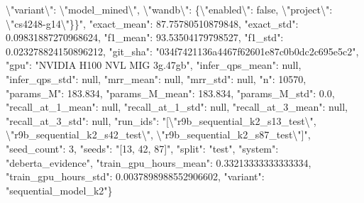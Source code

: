 \textbackslash{}"variant\textbackslash{}": \textbackslash{}"model\_mined\textbackslash{}", \textbackslash{}"wandb\textbackslash{}": \{\textbackslash{}"enabled\textbackslash{}": false, \textbackslash{}"project\textbackslash{}": \textbackslash{}"cs4248-g14\textbackslash{}"\}\}", "exact\_mean": 87.75780510879848, "exact\_std": 0.09831887270968624, "f1\_mean": 93.53504179798527, "f1\_std": 0.023278824150896212, "git\_sha": "034f7421136a4467f62601e87c0b0dc2c695e5c2", "gpu": "NVIDIA H100 NVL MIG 3g.47gb", "infer\_qps\_mean": null, "infer\_qps\_std": null, "mrr\_mean": null, "mrr\_std": null, "n": 10570, "params\_M": 183.834, "params\_M\_mean": 183.834, "params\_M\_std": 0.0, "recall\_at\_1\_mean": null, "recall\_at\_1\_std": null, "recall\_at\_3\_mean": null, "recall\_at\_3\_std": null, "run\_ids": "[\textbackslash{}"r9b\_sequential\_k2\_s13\_test\textbackslash{}", \textbackslash{}"r9b\_sequential\_k2\_s42\_test\textbackslash{}", \textbackslash{}"r9b\_sequential\_k2\_s87\_test\textbackslash{}"]", "seed\_count": 3, "seeds": "[13, 42, 87]", "split": "test", "system": "deberta\_evidence", "train\_gpu\_hours\_mean": 0.33213333333333334, "train\_gpu\_hours\_std": 0.0037898988552906602, "variant": "sequential\_model\_k2"\}
